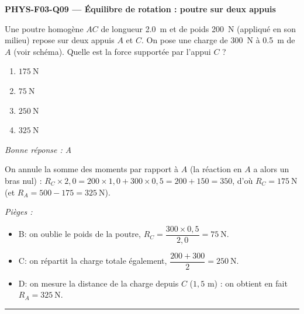 \documentclass[11pt,a4paper]{article}
\begin{document}
\noindent\textbf{PHYS-F03-Q09 --- Équilibre de rotation : poutre sur deux appuis}\par
Une poutre homogène $AC$ de longueur \qty{2.0}{\metre} et de poids \qty{200}{\newton} (appliqué en son
milieu) repose sur deux appuis $A$ et $C$. On pose une charge de \qty{300}{\newton} à \qty{0.5}{\metre}
de $A$ (voir schéma). Quelle est la force supportée par l'appui $C$ ?
\begin{center}
\end{center}
\begin{enumerate}[label=\Alph*)]
\item $\qty{175}{\newton}$
\item $\qty{75}{\newton}$
\item $\qty{250}{\newton}$
\item $\qty{325}{\newton}$
\end{enumerate}
\textit{Bonne réponse : A}\par
On annule la somme des moments par rapport à $A$ (la réaction en $A$ a alors un bras nul) :
$R_C\times 2{,}0 = 200\times 1{,}0 + 300\times 0{,}5 = 200 + 150 = 350$, d'où
$R_C = \qty{175}{\newton}$ (et $R_A = 500 - 175 = \qty{325}{\newton}$).\par
\textit{Pièges :}
\begin{itemize}
\item B: on oublie le poids de la poutre, $R_C = \dfrac{300\times 0{,}5}{2{,}0} = \qty{75}{\newton}$.
\item C: on répartit la charge totale également, $\dfrac{200+300}{2} = \qty{250}{\newton}$.
\item D: on mesure la distance de la charge depuis $C$ ($1{,}5$ m) : on obtient en fait $R_A = \qty{325}{\newton}$.
\end{itemize}
\vspace{8pt}\hrule\vspace{8pt}
\end{document}

